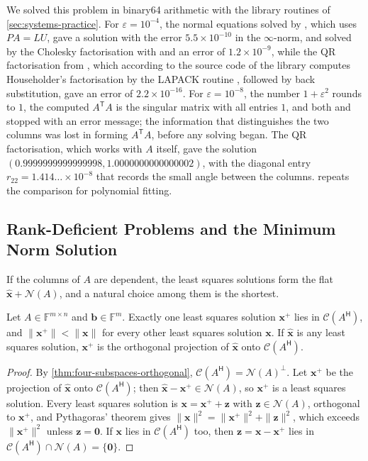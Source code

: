 We solved this problem in binary64 arithmetic with the library routines of \cref{sec:systems-practice}. For $\varepsilon=10^{-4}$, the normal equations solved by , which uses $PA=LU$, gave a solution with the error $5.5\times10^{-10}$ in the $\infty$-norm, and solved by the Cholesky factorisation with  and  an error of $1.2\times10^{-9}$, while the QR factorisation from , which according to the source code of the library computes Householder's factorisation by the LAPACK routine , followed by back substitution, gave an error of $2.2\times10^{-16}$. For $\varepsilon=10^{-8}$, the number $1+\varepsilon^2$ rounds to $1$, the computed $A^{\mathsf T}A$ is the singular matrix with all entries $1$, and both  and  stopped with an error message; the information that distinguishes the two columns was lost in forming $A^{\mathsf T}A$, before any solving began. The QR factorisation, which works with $A$ itself, gave the solution $(0.9999999999999998,1.0000000000000002)$, with the diagonal entry $r_{22}=1.414\ldots\times10^{-8}$ that records the small angle between the columns.  repeats the comparison for polynomial fitting.

\subsection{Rank-Deficient Problems and the Minimum Norm Solution}

If the columns of $A$ are dependent, the least squares solutions form the flat $\hat{\mathbf x}+\mathcal N(A)$, and a natural choice among them is the shortest.

\begin{proposition}
\label{prop:minimum-norm}
Let $A\in\mathbb F^{m\times n}$ and $\mathbf b\in\mathbb F^m$. Exactly one least squares solution $\mathbf x^+$ lies in $\mathcal C(A^{\mathsf H})$, and $\|\mathbf x^+\|<\|\mathbf x\|$ for every other least squares solution $\mathbf x$. If $\hat{\mathbf x}$ is any least squares solution, $\mathbf x^+$ is the orthogonal projection of $\hat{\mathbf x}$ onto $\mathcal C(A^{\mathsf H})$.
\end{proposition}

\begin{proof}
By \cref{thm:four-subspaces-orthogonal}, $\mathcal C(A^{\mathsf H})=\mathcal N(A)^\perp$. Let $\mathbf x^+$ be the projection of $\hat{\mathbf x}$ onto $\mathcal C(A^{\mathsf H})$; then $\hat{\mathbf x}-\mathbf x^+\in\mathcal N(A)$, so $\mathbf x^+$ is a least squares solution. Every least squares solution is $\mathbf x=\mathbf x^++\mathbf z$ with $\mathbf z\in\mathcal N(A)$, orthogonal to $\mathbf x^+$, and Pythagoras' theorem gives $\|\mathbf x\|^2=\|\mathbf x^+\|^2+\|\mathbf z\|^2$, which exceeds $\|\mathbf x^+\|^2$ unless $\mathbf z=\mathbf 0$. If $\mathbf x$ lies in $\mathcal C(A^{\mathsf H})$ too, then $\mathbf z=\mathbf x-\mathbf x^+$ lies in $\mathcal C(A^{\mathsf H})\cap\mathcal N(A)=\{\mathbf 0\}$.
\end{proof}

